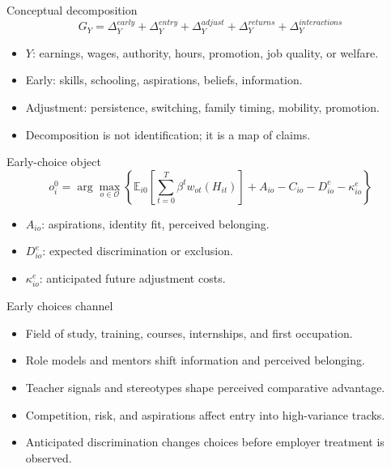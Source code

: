 \documentclass[aspectratio=169,11pt]{beamer}
\begin{document}
\begin{frame}{Conceptual decomposition}
\[
G_Y =
\Delta^{early}_Y
+ \Delta^{entry}_Y
+ \Delta^{adjust}_Y
+ \Delta^{returns}_Y
+ \Delta^{interactions}_Y
\]
\begin{itemize}
    \item \(Y\): earnings, wages, authority, hours, promotion, job quality, or welfare.
    \item Early: skills, schooling, aspirations, beliefs, information.
    \item Adjustment: persistence, switching, family timing, mobility, promotion.
    \item Decomposition is not identification; it is a map of claims.
\end{itemize}
\end{frame}

\begin{frame}{Early-choice object}
\[
o_i^0 =
\arg\max_{o \in \mathcal{O}}
\left\{
\mathbb{E}_{i0}\left[\sum_{t=0}^{T}\beta^t w_{ot}(H_{it})\right]
+ A_{io}
- C_{io}
- D^e_{io}
- \kappa^e_{io}
\right\}
\]
\begin{itemize}
    \item \(A_{io}\): aspirations, identity fit, perceived belonging.
    \item \(D^e_{io}\): expected discrimination or exclusion.
    \item \(\kappa^e_{io}\): anticipated future adjustment costs.
\end{itemize}
\end{frame}

\begin{frame}{Early choices channel}
\begin{itemize}
    \item Field of study, training, courses, internships, and first occupation.
    \item Role models and mentors shift information and perceived belonging.
    \item Teacher signals and stereotypes shape perceived comparative advantage.
    \item Competition, risk, and aspirations affect entry into high-variance tracks.
    \item Anticipated discrimination changes choices before employer treatment is observed.
\end{itemize}
\end{frame}
\end{document}
